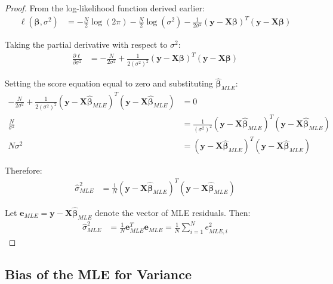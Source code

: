 \documentclass{article}
\begin{document}
\begin{proof}
From the log-likelihood function derived earlier:
\begin{align}
\ell(\boldsymbol{\beta}, \sigma^2) &= -\frac{N}{2}\log(2\pi) - \frac{N}{2}\log(\sigma^2) - \frac{1}{2\sigma^2}(\mathbf{y} - \mathbf{X}\boldsymbol{\beta})^T(\mathbf{y} - \mathbf{X}\boldsymbol{\beta}) \label{eq:loglik_full}
\end{align}

Taking the partial derivative with respect to $\sigma^2$:
\begin{align}
\frac{\partial \ell}{\partial \sigma^2} &= -\frac{N}{2\sigma^2} + \frac{1}{2(\sigma^2)^2}(\mathbf{y} - \mathbf{X}\boldsymbol{\beta})^T(\mathbf{y} - \mathbf{X}\boldsymbol{\beta}) \label{eq:score_sigma2}
\end{align}

Setting the score equation equal to zero and substituting $\hat{\boldsymbol{\beta}}_{MLE}$:
\begin{align}
-\frac{N}{2\sigma^2} + \frac{1}{2(\sigma^2)^2}(\mathbf{y} - \mathbf{X}\hat{\boldsymbol{\beta}}_{MLE})^T(\mathbf{y} - \mathbf{X}\hat{\boldsymbol{\beta}}_{MLE}) &= 0 \nonumber\\
\frac{N}{\sigma^2} &= \frac{1}{(\sigma^2)^2}(\mathbf{y} - \mathbf{X}\hat{\boldsymbol{\beta}}_{MLE})^T(\mathbf{y} - \mathbf{X}\hat{\boldsymbol{\beta}}_{MLE}) \nonumber\\
N\sigma^2 &= (\mathbf{y} - \mathbf{X}\hat{\boldsymbol{\beta}}_{MLE})^T(\mathbf{y} - \mathbf{X}\hat{\boldsymbol{\beta}}_{MLE})
\end{align}

Therefore:
\begin{align}
\hat{\sigma}^2_{MLE} &= \frac{1}{N}(\mathbf{y} - \mathbf{X}\hat{\boldsymbol{\beta}}_{MLE})^T(\mathbf{y} - \mathbf{X}\hat{\boldsymbol{\beta}}_{MLE}) \label{eq:mle_sigma2}
\end{align}

Let $\mathbf{e}_{MLE} = \mathbf{y} - \mathbf{X}\hat{\boldsymbol{\beta}}_{MLE}$ denote the vector of MLE residuals. Then:
\begin{align}
\hat{\sigma}^2_{MLE} &= \frac{1}{N}\mathbf{e}_{MLE}^T\mathbf{e}_{MLE} = \frac{1}{N}\sum_{i=1}^N e_{MLE,i}^2 \label{eq:mle_sigma2_residuals}
\end{align}
\end{proof}

\subsection{Bias of the MLE for Variance}
\end{document}
